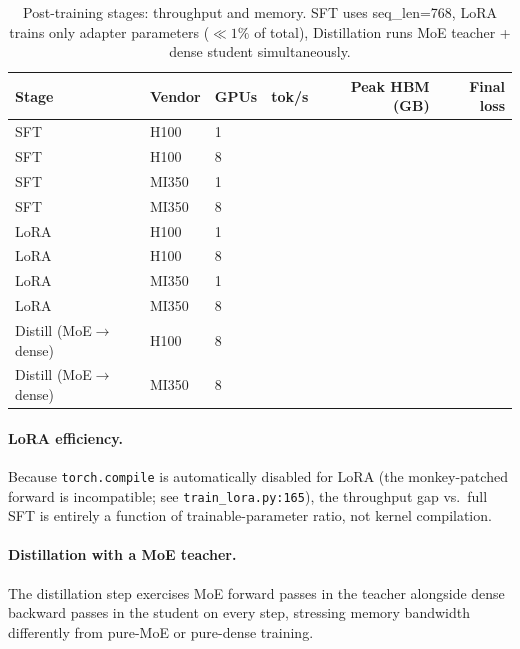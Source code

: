 \begin{table}[h]
\centering
\caption{Post-training stages: throughput and memory. SFT uses seq\_len=768,
LoRA trains only adapter parameters ($\ll 1\%$ of total), Distillation
runs MoE teacher + dense student simultaneously.}
\label{tab:posttrain}
\small
\begin{tabular}{lllrrr}
\toprule
\textbf{Stage} & \textbf{Vendor} & \textbf{GPUs} &
\textbf{tok/s} & \textbf{Peak HBM (GB)} & \textbf{Final loss} \\
\midrule
SFT         & H100  & 1 & \PH{} & \PH{} & \PH{} \\
SFT         & H100  & 8 & \PH{} & \PH{} & \PH{} \\
SFT         & MI350 & 1 & \PH{} & \PH{} & \PH{} \\
SFT         & MI350 & 8 & \PH{} & \PH{} & \PH{} \\
\midrule
LoRA        & H100  & 1 & \PH{} & \PH{} & \PH{} \\
LoRA        & H100  & 8 & \PH{} & \PH{} & \PH{} \\
LoRA        & MI350 & 1 & \PH{} & \PH{} & \PH{} \\
LoRA        & MI350 & 8 & \PH{} & \PH{} & \PH{} \\
\midrule
Distill (MoE$\to$dense) & H100  & 8 & \PH{} & \PH{} & \PH{} \\
Distill (MoE$\to$dense) & MI350 & 8 & \PH{} & \PH{} & \PH{} \\
\bottomrule
\end{tabular}
\end{table}

\paragraph{LoRA efficiency.}
Because \texttt{torch.compile} is automatically disabled for LoRA (the
monkey-patched forward is incompatible; see \texttt{train\_lora.py:165}),
the throughput gap vs.\ full SFT is entirely a function of trainable-parameter
ratio, not kernel compilation.

\paragraph{Distillation with a MoE teacher.}
The distillation step exercises MoE forward passes in the teacher alongside
dense backward passes in the student on every step, stressing memory bandwidth
differently from pure-MoE or pure-dense training.

